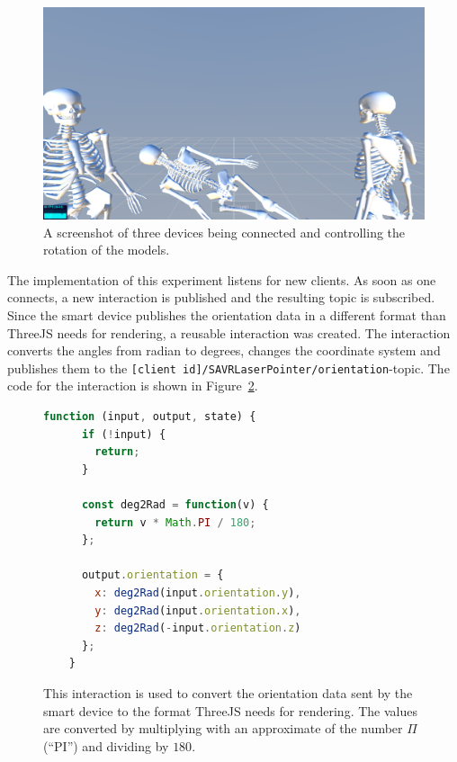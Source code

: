 \begin{figure}[htpb]
  \centering
  \includegraphics[width=12cm]{figures/screenshot_exp_mv.png}
  \caption[Screenshot: model viewer experiment]{A screenshot of three devices being connected and controlling the rotation of the models.}\label{fig:screenshot-exp-mv}
\end{figure}

The implementation of this experiment listens for new clients. As soon as one connects, a new interaction is published and the resulting topic is subscribed. Since the smart device publishes the orientation data in a different format than ThreeJS needs for rendering, a reusable interaction was created. The interaction converts the angles from radian to degrees, changes the coordinate system and publishes them to the \lstinline[breaklines=false]{[client id]/SAVRLaserPointer/orientation}-topic. The code for the interaction is shown in Figure~\ref{fig:ubii-interaction-angles}.

\begin{figure}[H]
  \begin{lstlisting}[language=JavaScript]
    function (input, output, state) {
      if (!input) {
        return;
      }

      const deg2Rad = function(v) {
        return v * Math.PI / 180;
      };

      output.orientation = {
        x: deg2Rad(input.orientation.y),
        y: deg2Rad(input.orientation.x),
        z: deg2Rad(-input.orientation.z)
      };
    }
  \end{lstlisting}
  \caption[UBII interaction converting euler angles in radians to degrees]{This interaction is used to convert the orientation data sent by the smart device to the format ThreeJS needs for rendering. The values are converted by multiplying with an approximate of the number $\Pi$ (\enquote{PI}) and dividing by $180$.}\label{fig:ubii-interaction-angles}
\end{figure}



